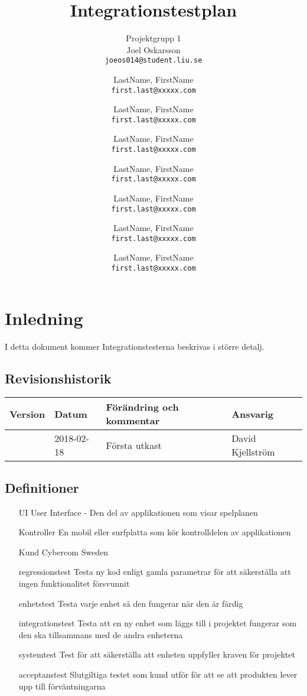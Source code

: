 \documentclass[10pt]{article}
\title{Integrationstestplan}
\author{
	Projektgrupp 1\\
	Joel Oskarsson\\
	\texttt{joeos014@student.liu.se}
	\and
	LastName, FirstName\\
	\texttt{first.last@xxxxx.com}
	\and
	LastName, FirstName\\
	\texttt{first.last@xxxxx.com}
	\and
	LastName, FirstName\\
	\texttt{first.last@xxxxx.com}
	\and
	LastName, FirstName\\
	\texttt{first.last@xxxxx.com}
  	\and
  	LastName, FirstName\\
  	\texttt{first.last@xxxxx.com}
  	\and
  	LastName, FirstName\\
  	\texttt{first.last@xxxxx.com}
  	\and
  	LastName, FirstName\\
  	\texttt{first.last@xxxxx.com}
}
\begin{document}
\maketitle
\pagebreak
\tableofcontents
\pagebreak
\section{Inledning}
     I detta dokument kommer Integrationstesterna beskrivas i större detalj.
	\subsection{Revisionshistorik}

	
	\begin{center}
 	   \begin{tabular}{| l | l | l |  l | }
 	       \hline
 	       \textbf{Version} & \textbf{Datum} & \textbf{Förändring och kommentar} & \textbf{Ansvarig} \\
 	       \hline
 	       \centering 0.1 & 2018-02-18 & Första utkast & David Kjellström\\
 	       \hline
 	   \end{tabular}
	\end{center}


	\subsection{Definitioner}
		\begin{itemize}
		\item [UI] User Interface - Den del av applikationen som visar spelplanen
		\item [Kontroller] En mobil eller surfplatta som kör kontrolldelen av applikationen
		\item [Kund] Cybercom Sweden
		\item [regressionstest] Testa ny kod enligt gamla parametrar för att säkerställa att ingen funktionalitet försvunnit
		\item [enhetstest] Testa varje enhet så den fungerar när den är färdig
		\item [integrationstest] Testa att en ny enhet som läggs till i projektet fungerar som den ska tillsammans med de andra enheterna
		\item [systemtest] Test för att säkerställa att enheten uppfyller kraven för projektet
		\item [acceptanstest] Slutgiltiga testet som kund utför för att se att produkten lever upp till förväntningarna
		\end{itemize}
	
\end{document}
